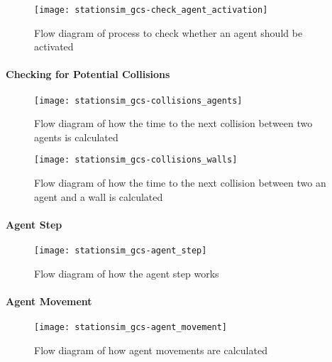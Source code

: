 \begin{figure}[h]
    \centering
    \texttt{[image: stationsim\_gcs-check\_agent\_activation]}
    \caption{Flow diagram of process to check whether an agent should be
    activated}\label{fig:flow:check_agent_activation}
\end{figure}

\paragraph{Checking for Potential Collisions}\label{para:submodels:collisions}

\begin{figure}[h]
    \centering
    \texttt{[image: stationsim\_gcs-collisions\_agents]}
    \caption{Flow diagram of how the time to the next collision between two
    agents is calculated}\label{fig:flow:agent_collisions}
\end{figure}

\begin{figure}[h]
    \centering
    \texttt{[image: stationsim\_gcs-collisions\_walls]}
    \caption{Flow diagram of how the time to the next collision between two an
    agent and a wall is calculated}\label{fig:flow:wall_collisions}
\end{figure}

\paragraph{Agent Step}\label{para:submodels:agent_step}

\begin{figure}[h]
    \centering
    \texttt{[image: stationsim\_gcs-agent\_step]}
    \caption{Flow diagram of how the agent step
    works}\label{fig:flow:agent_step}
\end{figure}

\paragraph{Agent Movement}\label{para:submodels:agent_movement}

\begin{figure}[h]
    \centering
    \texttt{[image: stationsim\_gcs-agent\_movement]}
    \caption{Flow diagram of how agent movements are
    calculated}\label{fig:flow:agent_movement}
\end{figure}

